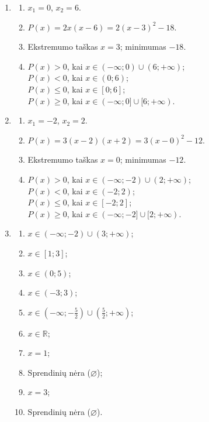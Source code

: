 \documentclass[11pt,a4paper]{article}
\begin{document}
\begin{enumerate}[label=\textbf{\arabic*.},leftmargin=2.6em,itemsep=0.85em,topsep=0.55em]
\item
\begin{enumerate}[label=\alph*),leftmargin=2em,itemsep=0.2em,topsep=0.2em]
  \item $x_1=0$, $x_2=6$.
  \item $P(x)=2x(x-6)=2(x-3)^2-18$.
  \item Ekstremumo taškas $x=3$; minimumas $-18$.
  \item $P(x)>0$, kai $x\in(-\infty;0)\cup(6;+\infty)$;\\
        $P(x)<0$, kai $x\in(0;6)$;\\
        $P(x)\le0$, kai $x\in[0;6]$;\\
        $P(x)\ge0$, kai $x\in(-\infty;0]\cup[6;+\infty)$.
\end{enumerate}

\item
\begin{enumerate}[label=\alph*),leftmargin=2em,itemsep=0.2em,topsep=0.2em]
  \item $x_1=-2$, $x_2=2$.
  \item $P(x)=3(x-2)(x+2)=3(x-0)^2-12$.
  \item Ekstremumo taškas $x=0$; minimumas $-12$.
  \item $P(x)>0$, kai $x\in(-\infty;-2)\cup(2;+\infty)$;\\
        $P(x)<0$, kai $x\in(-2;2)$;\\
        $P(x)\le0$, kai $x\in[-2;2]$;\\
        $P(x)\ge0$, kai $x\in(-\infty;-2]\cup[2;+\infty)$.
\end{enumerate}

\item
\begin{enumerate}[label=\alph*),leftmargin=2em,itemsep=0.2em,topsep=0.2em]
  \item $x\in(-\infty;-2)\cup(3;+\infty)$;
  \item $x\in[1;3]$;
  \item $x\in(0;5)$;
  \item $x\in(-3;3)$;
  \item $x\in\left(-\infty;-\frac52\right)\cup\left(\frac52;+\infty\right)$;
  \item $x\in\mathbb{R}$;
  \item $x=1$;
  \item Sprendinių nėra ($\varnothing$);
  \item $x=3$;
  \item Sprendinių nėra ($\varnothing$).
\end{enumerate}


\end{enumerate}
\end{document}
